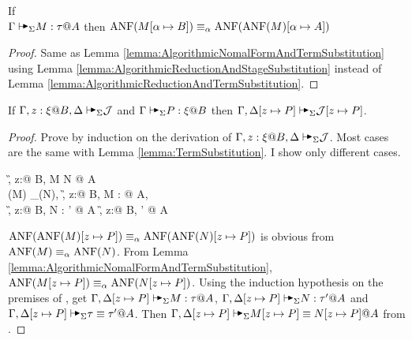\begin{lemma}
    \label{lemma:AlgorithmicNomalFormAndStageSubstitution}
    If \\ \( \G \AVS M : \tau @ A \) then
    \( \text{ANF}(M[\alpha \mapsto B]) \equiv_\alpha \text{ANF}(\text{ANF}(M)[\alpha \mapsto A]) \)
\end{lemma}

\begin{proof}
    Same as Lemma \ref{lemma:AlgorithmicNomalFormAndTermSubstitution} using
    Lemma \ref{lemma:AlgorithmicReductionAndStageSubstitution} instead of Lemma
    \ref{lemma:AlgorithmicReductionAndTermSubstitution}.
\end{proof}

\begin{lemma}
    \label{lemma:TermSubstitutionLemmaOfAlgorithmicJudgement}
    If $\G, z:\xi@B, \D \AVS \mathcal{J}$ and $\G\AVS P:\xi @B$ then $\G, \D[z \mapsto P] \AVS \mathcal{J}[z \mapsto P]$.
\end{lemma}

\begin{proof}
    Prove by induction on the derivation of \( \G, z:\xi@B, \D \AVS \mathcal{J}
    \). Most cases are the same with Lemma \ref{lemma:TermSubstitution}. I show
    only different cases.

    \begin{rneqncase}{\QAANF}{
            \G, z:\xi @ B, \D \AVS M \E N @ A
             \\
            \ANF(M) \E_\alpha \ANF(N),
            \G, z:\xi @ B, \D \AVS M : \tau @ A, \\
            \G, z:\xi @ B, \D \AVS N : \tau' @ A 
            \G, z:\xi @ B, \D \AVS \tau \E \tau' @ A
        }
    \end{rneqncase}
    \( \text{ANF}(\text{ANF}(M)[z \mapsto P]) \equiv_\alpha \text{ANF}(\text{ANF}(N)[z \mapsto P]) \) is
    obvious from \( \text{ANF}(M) \equiv_\alpha \text{ANF}(N) \).  From Lemma
    \ref{lemma:AlgorithmicNomalFormAndTermSubstitution}, \( \text{ANF}(M[z \mapsto
    P]) \equiv_\alpha \text{ANF}(N[z \mapsto P]) \). Using the induction hypothesis on
    the premises of \QAANF, get \( \G, \D[z \mapsto P] \AVS M : \tau @ A \), \(
    \G, \D[z \mapsto P] \AVS N : \tau' @ A \) and \( \G, \D[z \mapsto P] \AVS
    \tau \E \tau' @ A \). Then \( \G, \D[z \mapsto P] \AVS M[z \mapsto P] \E
    N[z \mapsto P] @ A \) from \QAANF.
\end{proof}

